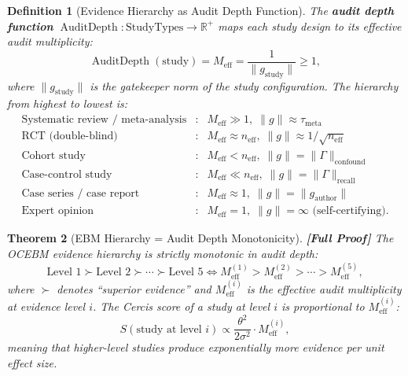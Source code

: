 \documentclass[12pt,a4paper]{article}
\newtheorem{theorem}{Theorem}[section]
\newtheorem{definition}[theorem]{Definition}
\theoremstyle{remark}
\newcommand{\R}{\mathbb{R}}
\newcommand{\Cercis}{\textsf{Cercis}}
\DeclareMathOperator{\AuditDepth}{AuditDepth}
\newcommand{\rigorFull}{\textbf{[Full Proof]}}
\begin{document}
\begin{definition}[Evidence Hierarchy as Audit Depth Function]
\label{def:audit_depth}
The \textbf{audit depth function} $\AuditDepth: \text{StudyTypes} \to \R^+$
maps each study design to its effective audit multiplicity:
\begin{equation}
  \AuditDepth(\text{study}) = M_{\text{eff}} =
  \frac{1}{\|g_{\text{study}}\|} \geq 1,
\end{equation}
where $\|g_{\text{study}}\|$ is the gatekeeper norm of the study
configuration. The hierarchy from highest to lowest is:
\begin{equation}
  \begin{array}{lll}
    \text{Systematic review / meta-analysis} &:& M_{\text{eff}} \gg 1,
    \;\|g\| \approx \tau_{\text{meta}} \\[4pt]
    \text{RCT (double-blind)} &:& M_{\text{eff}} \approx n_{\text{eff}},
    \;\|g\| \approx 1/\sqrt{n_{\text{eff}}} \\[4pt]
    \text{Cohort study} &:& M_{\text{eff}} < n_{\text{eff}},
    \;\|g\| = \|\Gamma\|_{\text{confound}} \\[4pt]
    \text{Case-control study} &:& M_{\text{eff}} \ll n_{\text{eff}},
    \;\|g\| = \|\Gamma\|_{\text{recall}} \\[4pt]
    \text{Case series / case report} &:& M_{\text{eff}} \approx 1,
    \;\|g\| = \|g_{\text{author}}\| \\[4pt]
    \text{Expert opinion} &:& M_{\text{eff}} = 1,
    \;\|g\| = \infty \text{ (self-certifying)}.
  \end{array}
\end{equation}
\end{definition}

\begin{theorem}[EBM Hierarchy = Audit Depth Monotonicity]
\label{thm:hierarchy_depth}
\rigorFull
The OCEBM evidence hierarchy is strictly monotonic in audit depth:
\begin{equation}
  \text{Level 1} \succ \text{Level 2} \succ \cdots \succ \text{Level 5}
  \iff M_{\text{eff}}^{(1)} > M_{\text{eff}}^{(2)} > \cdots >
  M_{\text{eff}}^{(5)},
\end{equation}
where $\succ$ denotes ``superior evidence'' and $M_{\text{eff}}^{(i)}$ is
the effective audit multiplicity at evidence level $i$. The \Cercis{}
score of a study at level $i$ is proportional to $M_{\text{eff}}^{(i)}$:
\begin{equation}
  S(\text{study at level } i) \propto
  \frac{\theta^2}{2\sigma^2} \cdot M_{\text{eff}}^{(i)},
\end{equation}
meaning that higher-level studies produce exponentially more evidence
per unit effect size.
\end{theorem}
\end{document}
